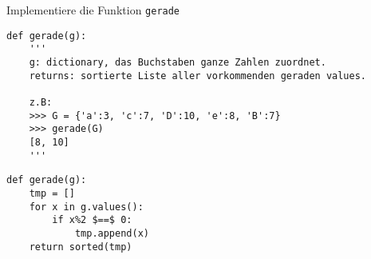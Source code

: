 \question[4] Implementiere die Funktion \texttt{gerade}
\begin{lstlisting}
def gerade(g):
    '''
    g: dictionary, das Buchstaben ganze Zahlen zuordnet.
    returns: sortierte Liste aller vorkommenden geraden values.

    z.B:
    >>> G = {'a':3, 'c':7, 'D':10, 'e':8, 'B':7}
    >>> gerade(G)
    [8, 10]
    '''

\end{lstlisting}
\begin{solutionbox}{8cm}
\begin{lstlisting}
def gerade(g):
    tmp = []
    for x in g.values():
        if x%2 $==$ 0:
            tmp.append(x)
    return sorted(tmp)
\end{lstlisting}
\end{solutionbox}
